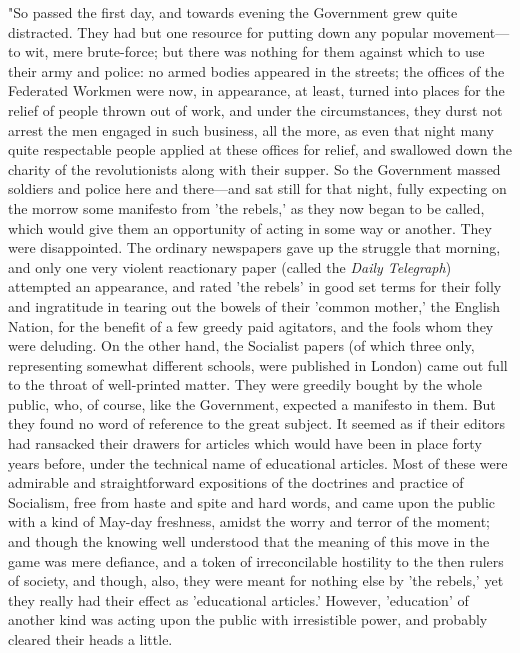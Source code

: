 "So passed the first day, and towards evening the Government grew quite
distracted. They had but one resource for putting down any popular
movement---to wit, mere brute-force; but there was nothing for them
against which to use their army and police: no armed bodies appeared in
the streets; the offices of the Federated Workmen were now, in
appearance, at least, turned into places for the relief of people thrown
out of work, and under the circumstances, they durst not arrest the men
engaged in such business, all the more, as even that night many quite
respectable people applied at these offices for relief, and swallowed
down the charity of the revolutionists along with their supper. So the
Government massed soldiers and police here and there---and sat still for
that night, fully expecting on the morrow some manifesto from 'the
rebels,' as they now began to be called, which would give them an
opportunity of acting in some way or another. They were disappointed.
The ordinary newspapers gave up the struggle that morning, and only one
very violent reactionary paper (called the \emph{Daily Telegraph})
attempted an appearance, and rated 'the rebels' in good set terms for
their folly and ingratitude in tearing out the bowels of their 'common
mother,' the English Nation, for the benefit of a few greedy paid
agitators, and the fools whom they were deluding. On the other hand, the
Socialist papers (of which three only, representing somewhat different
schools, were published in London) came out full to the throat of
well-printed matter. They were greedily bought by the whole public, who,
of course, like the Government, expected a manifesto in them. But they
found no word of reference to the great subject. It seemed as if their
editors had ransacked their drawers for articles which would have been
in place forty years before, under the technical name of educational
articles. Most of these were admirable and straightforward expositions
of the doctrines and practice of Socialism, free from haste and spite
and hard words, and came upon the public with a kind of May-day
freshness, amidst the worry and terror of the moment; and though the
knowing well understood that the meaning of this move in the game was
mere defiance, and a token of irreconcilable hostility to the then
rulers of society, and though, also, they were meant for nothing else by
'the rebels,' yet they really had their effect as 'educational
articles.' However, 'education' of another kind was acting upon the
public with irresistible power, and probably cleared their heads a
little.

